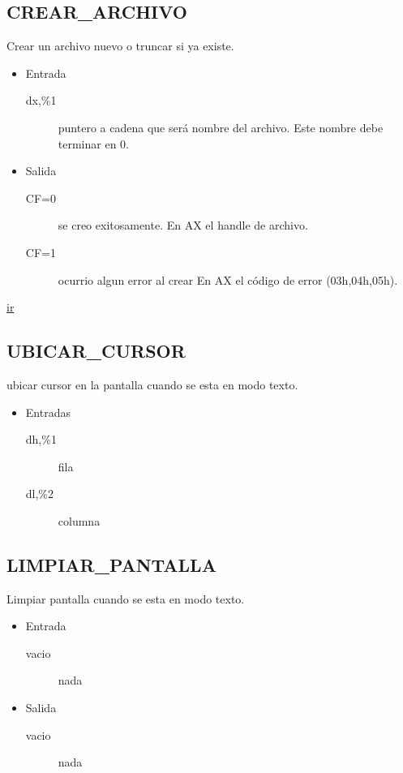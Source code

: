 \subsection{CREAR\_ARCHIVO}
\label{sec-1-8}
Crear un archivo nuevo o truncar si ya existe.
\begin{itemize}
\item Entrada
\begin{description}
\item[dx,\%1] puntero a cadena que será nombre del
archivo. Este nombre debe terminar en 0.
\end{description}
\item Salida
\begin{description}
\item[CF=0] se creo exitosamente. En AX el handle de
archivo.
\item[CF=1] ocurrio algun error al crear En AX el código
de error (03h,04h,05h).
\end{description}
\end{itemize}
\href{http://www.ctyme.com/intr/rb-2778.htm#Table1401}{ir}


\subsection{UBICAR\_CURSOR}
\label{sec-1-9}
ubicar cursor en la pantalla cuando se esta en modo
texto.
\begin{itemize}
\item Entradas
\begin{description}
\item[dh,\%1] fila
\item[dl,\%2] columna
\end{description}
\end{itemize}


\subsection{LIMPIAR\_PANTALLA}
\label{sec-1-10}
Limpiar pantalla cuando se esta en modo texto.
\begin{itemize}
\item Entrada
\begin{description}
\item[vacio] nada
\end{description}
\item Salida
\begin{description}
\item[vacio] nada
\end{description}
\end{itemize}


